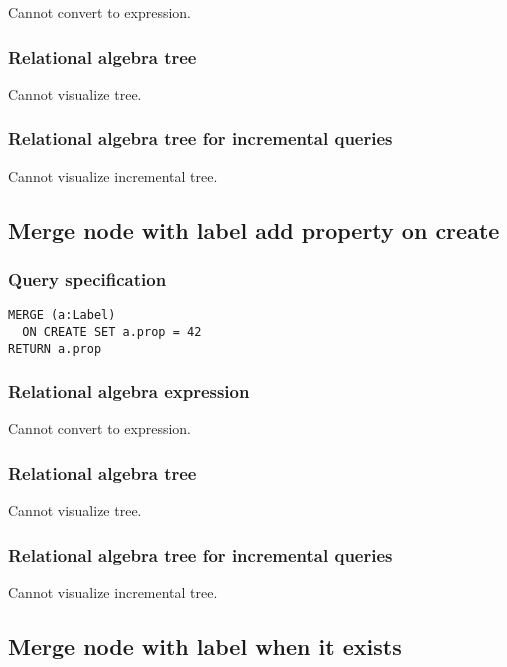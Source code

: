 Cannot convert to expression.

\subsubsection*{Relational algebra tree}

Cannot visualize tree.

\subsubsection*{Relational algebra tree for incremental queries}

Cannot visualize incremental tree.

\subsection{Merge node with label add property on create}

\subsubsection*{Query specification}

\begin{lstlisting}
MERGE (a:Label)
  ON CREATE SET a.prop = 42
RETURN a.prop
\end{lstlisting}

\subsubsection*{Relational algebra expression}

Cannot convert to expression.

\subsubsection*{Relational algebra tree}

Cannot visualize tree.

\subsubsection*{Relational algebra tree for incremental queries}

Cannot visualize incremental tree.

\subsection{Merge node with label when it exists}

